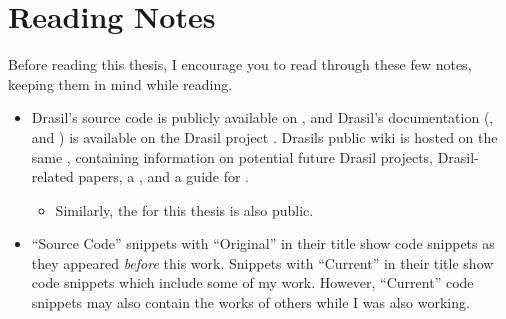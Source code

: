 \chapter{Reading Notes}
\label{chap:reading_notes}

Before reading this thesis, I encourage you to read through these few notes,
keeping them in mind while reading.

\begin{itemize}

      \item Drasil's source code is publicly available on
            , and
            Drasil's documentation
            (,
            and
            )
            is available on the Drasil project
            .
            Drasils public wiki is hosted on the same ,
            containing information on potential future Drasil projects,
            Drasil-related papers, a ,
            and a guide for .

            \begin{itemize}

                  \item Similarly, the 
                              for this thesis is also public.

            \end{itemize}

      \item ``Source Code'' snippets with ``Original'' in their title show code
            snippets as they appeared \textit{before} this work. Snippets with
            ``Current'' in their title show code snippets which include some of
            my work. However, ``Current'' code snippets may also contain the
            works of others while I was also working.


\end{itemize}
